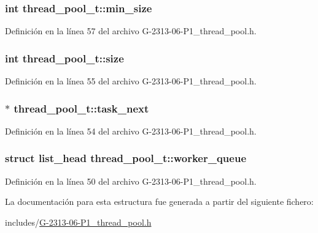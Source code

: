 \subsubsection[{min\+\_\+size}]{\setlength{\rightskip}{0pt plus 5cm}int thread\+\_\+pool\+\_\+t\+::min\+\_\+size}\label{structthread__pool__t_a80aa1805a11e2e6e2bf5811fda0ffc26}


Definición en la línea 57 del archivo G-\/2313-\/06-\/\+P1\+\_\+thread\+\_\+pool.\+h.

\hypertarget{structthread__pool__t_a3185c157636a142415699a20042d6dd8}{}
\subsubsection[{size}]{\setlength{\rightskip}{0pt plus 5cm}int thread\+\_\+pool\+\_\+t\+::size}\label{structthread__pool__t_a3185c157636a142415699a20042d6dd8}


Definición en la línea 55 del archivo G-\/2313-\/06-\/\+P1\+\_\+thread\+\_\+pool.\+h.

\hypertarget{structthread__pool__t_a00ce5a27204f85e624552f7448ba7093}{}
\subsubsection[{task\+\_\+next}]{$\ast$ thread\+\_\+pool\+\_\+t\+::task\+\_\+next}\label{structthread__pool__t_a00ce5a27204f85e624552f7448ba7093}


Definición en la línea 54 del archivo G-\/2313-\/06-\/\+P1\+\_\+thread\+\_\+pool.\+h.

\hypertarget{structthread__pool__t_a44640e57780a54d437d7589b1c754ac1}{}
\subsubsection[{worker\+\_\+queue}]{\setlength{\rightskip}{0pt plus 5cm}struct {\bf list\+\_\+head} thread\+\_\+pool\+\_\+t\+::worker\+\_\+queue}\label{structthread__pool__t_a44640e57780a54d437d7589b1c754ac1}


Definición en la línea 50 del archivo G-\/2313-\/06-\/\+P1\+\_\+thread\+\_\+pool.\+h.



La documentación para esta estructura fue generada a partir del siguiente fichero\+:\begin{DoxyCompactItemize}
\item 
includes/\hyperlink{G-2313-06-P1__thread__pool_8h}{G-\/2313-\/06-\/\+P1\+\_\+thread\+\_\+pool.\+h}\end{DoxyCompactItemize}
